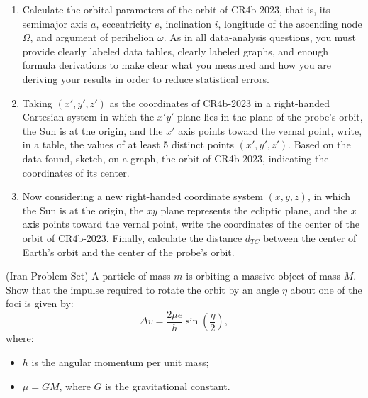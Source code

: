 \documentclass[11pt]{article}
\begin{document}
\begin{pproblem}
    \begin{enumerate}[label=(\alph*)]
        \item Calculate the orbital parameters of the orbit of CR4b-2023, that is, its semimajor axis \(a\), eccentricity \(e\), inclination \(i\), longitude of the ascending node \(\Omega\), and argument of perihelion \(\omega\). As in all data-analysis questions, you must provide clearly labeled data tables, clearly labeled graphs, and enough formula derivations to make clear what you measured and how you are deriving your results in order to reduce statistical errors.
        
        \item Taking \((x', y', z')\) as the coordinates of CR4b-2023 in a right-handed Cartesian system in which the \(x'y'\) plane lies in the plane of the probe's orbit, the Sun is at the origin, and the \(x'\) axis points toward the vernal point, write, in a table, the values of at least 5 distinct points \((x', y', z')\). Based on the data found, sketch, on a graph, the orbit of CR4b-2023, indicating the coordinates of its center.
        
        \item Now considering a new right-handed coordinate system \((x, y, z)\), in which the Sun is at the origin, the \(xy\) plane represents the ecliptic plane, and the \(x\) axis points toward the vernal point, write the coordinates of the center of the orbit of CR4b-2023. Finally, calculate the distance \(d_{TC}\) between the center of Earth's orbit and the center of the probe's orbit.
    \end{enumerate}

    
\end{pproblem}

\begin{pproblem} (Iran Problem Set) 
    A particle of mass \(m\) is orbiting a massive object of mass \(M\). Show that the impulse required to rotate the orbit by an angle \(\eta\) about one of the foci is given by:
    \[
    \Delta v = \frac{2\mu e}{h}\sin\left(\frac{\eta}{2}\right),
    \]
    where:
    \begin{itemize}
        \item \(h\) is the angular momentum per unit mass;
        \item \(\mu = GM\), where \(G\) is the gravitational constant.
    \end{itemize}
    
\end{pproblem}
\end{document}
